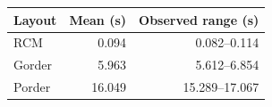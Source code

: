 \begin{tabular}{lrr}
\toprule
Layout & Mean (s) & Observed range (s) \\
\midrule
RCM & 0.094 & 0.082--0.114 \\
Gorder & 5.963 & 5.612--6.854 \\
Porder & 16.049 & 15.289--17.067 \\
\bottomrule
\end{tabular}
